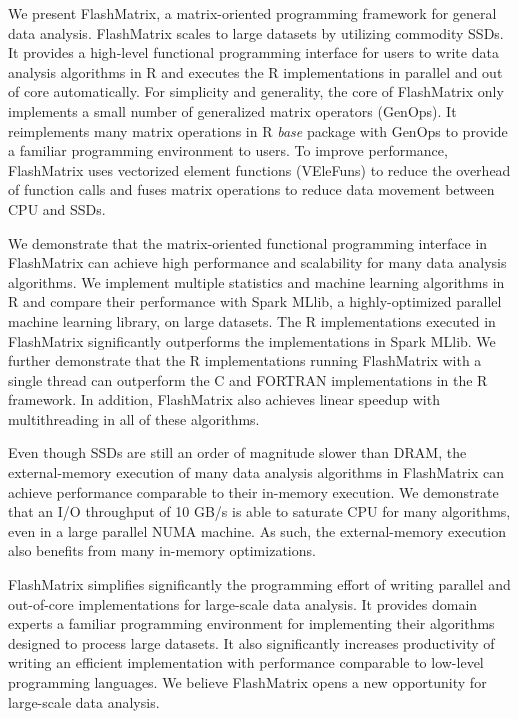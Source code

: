We present FlashMatrix, a matrix-oriented programming framework for general
data analysis. FlashMatrix scales to large datasets by utilizing commodity SSDs.
It provides a high-level functional programming interface for users to write
data analysis algorithms in R and
executes the R implementations in parallel and out of core automatically.
For simplicity and generality, the core of FlashMatrix only implements
a small number of generalized matrix operators (GenOps). It reimplements
many matrix operations in R \textit{base} package with GenOps to provide
a familiar programming environment to users. To improve performance,
FlashMatrix uses vectorized element functions (VEleFuns) to reduce the
overhead of function calls and fuses matrix operations to reduce data movement
between CPU and SSDs.

We demonstrate that the matrix-oriented functional programming interface in
FlashMatrix can achieve high performance and scalability for many data analysis
algorithms. We implement multiple statistics and
machine learning algorithms in R and compare their performance with Spark
MLlib, a highly-optimized parallel machine learning library, on large datasets.
The R implementations executed in FlashMatrix significantly outperforms
the implementations in Spark MLlib. We further demonstrate that
the R implementations running FlashMatrix with a single thread can outperform
the C and FORTRAN implementations in the R framework. In addition, FlashMatrix
also achieves linear speedup with multithreading in all of these algorithms.

Even though SSDs are still an order of magnitude slower than DRAM, the external-memory
execution of many data analysis algorithms in FlashMatrix can achieve performance
comparable to their in-memory execution. We demonstrate that an I/O throughput
of 10 GB/s is able to saturate CPU for many algorithms, even in a large parallel
NUMA machine. As such, the external-memory execution also benefits from many
in-memory optimizations.

FlashMatrix simplifies significantly the programming effort of writing
parallel and out-of-core implementations for large-scale data analysis. It
provides domain experts a familiar programming environment for implementing
their algorithms designed to process large datasets. It also significantly
increases productivity of writing an efficient implementation with performance
comparable to low-level programming languages. We believe FlashMatrix opens
a new opportunity for large-scale data analysis.
